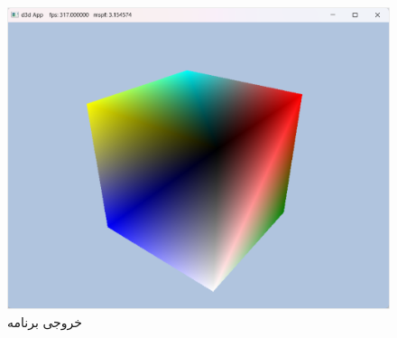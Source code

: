 {\begin{spacing}{1.3}
        \begin{figure}[H]
            \centering
            \setlength{\belowcaptionskip}{-10pt}
            \includegraphics[scale=0.8]{Images/3/3.Intro.5.10}
            \caption{خروجی برنامه}
            \label{fig:3.Intro.5.10}
        \end{figure}
    \end{spacing}
}
\textbf{\vspace{-10pt}}

